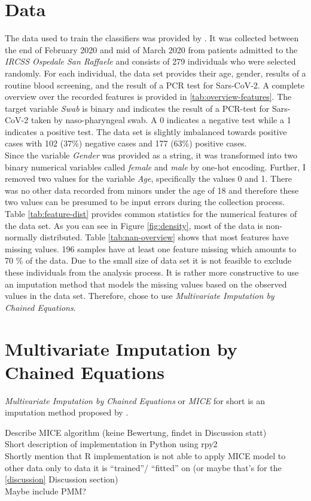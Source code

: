 \section{Data}
The data used to train the classifiers was provided by \citeauthor{RN127} \cite{RN127}. 
It was collected between the end of February 2020 and mid of March 2020 from patients admitted to the \textit{IRCSS Ospedale San Raffaele} and consists of 279 individuals who were selected randomly.
For each individual, the data set provides their age, gender, results of a 
routine blood screening, and the result of a PCR test for Sars-CoV-2.
A complete overview over the recorded features is provided in 
\ref{tab:overview-features}. The target variable \textit{Swab} is binary and 
indicates the result of a PCR-test for Sars-CoV-2 taken by naso-pharyngeal 
swab. A 0 indicates a negative test while a 1 indicates a positive test.
The data set is slightly imbalanced towards positive cases with 102 (37\%) 
negative cases and 177 (63\%) positive cases.
\\
Since the variable \textit{Gender} 
was provided as a string, it was transformed into two binary numerical 
variables called \textit{female} and \textit{male} by one-hot encoding.
Further, I removed two values for the variable \textit{Age}, specifically the 
values 0 and 1. There was no other data recorded from minors under the age of 
18 and therefore these two values can be presumed to be input errors during the 
collection process.
\\
Table \ref{tab:feature-dist} provides common statistics for the numerical 
features of the data set.
As you can see in Figure \ref{fig:density}, most of the data is non-normally 
distributed.
Table \ref{tab:nan-overview} shows that most features have missing values. 196 
samples have at least one feature missing which amounts to 70 \% of the data. 
Due to the small size of data set it is not feasible to exclude these 
individuals from the analysis process. It is rather more constructive to use an 
imputation method that models the missing values based on the observed values in 
the data set. Therefore, \citeauthor{RN127} chose to use \textit{Multivariate 
Imputation by Chained Equations}. 
\section{Multivariate Imputation by Chained Equations}
\textit{Multivariate Imputation by Chained Equations} or \textit{MICE} for 
short is an imputation method proposed by \citeauthor{RN135} \cite{RN135}.
\begin{changemargin}{50pt}{50pt}
Describe MICE algorithm (keine Bewertung, findet in Discussion statt)
\\
Short description of implementation in Python using rpy2
\\
Shortly mention that R implementation is not able to apply MICE model to other 
data only to data it is ``trained''/ ``fitted'' on (or maybe that's for the 
\ref{discussion} Discussion section)
\\
Maybe include PMM?
\end{changemargin}
